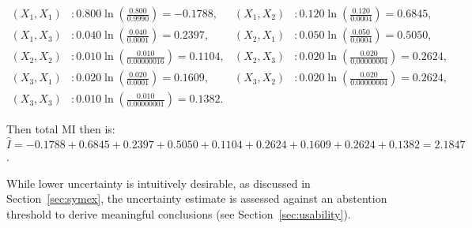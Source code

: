 \[
\begin{aligned}
    (X_1, X_1) &: 0.800 \ln \left( \frac{0.800}{0.9990} \right) = -0.1788, & (X_1, X_2) &: 0.120 \ln \left( \frac{0.120}{0.0004} \right) = 0.6845, \\
    (X_1, X_3) &: 0.040 \ln \left( \frac{0.040}{0.0001} \right) = 0.2397, & (X_2, X_1) &: 0.050 \ln \left( \frac{0.050}{0.0004} \right) = 0.5050, \\
    (X_2, X_2) &: 0.010 \ln \left( \frac{0.010}{0.00000016} \right) = 0.1104, & (X_2, X_3) &: 0.020 \ln \left( \frac{0.020}{0.00000004} \right) = 0.2624, \\
    (X_3, X_1) &: 0.020 \ln \left( \frac{0.020}{0.0001} \right) = 0.1609, & (X_3, X_2) &: 0.020 \ln \left( \frac{0.020}{0.00000004} \right) = 0.2624, \\
    (X_3, X_3) &: 0.010 \ln \left( \frac{0.010}{0.00000001} \right) = 0.1382.
\end{aligned}
\]

Then total MI then is:
    $\hat{I} = -0.1788 + 0.6845 + 0.2397 + 0.5050 + 0.1104 + 0.2624 + 0.1609 + 0.2624 + 0.1382 = 2.1847$.



While lower uncertainty is intuitively desirable, as discussed in Section~\ref{sec:symex}, the uncertainty estimate is assessed against an abstention threshold to derive meaningful conclusions (see Section~\ref{sec:usability}).


